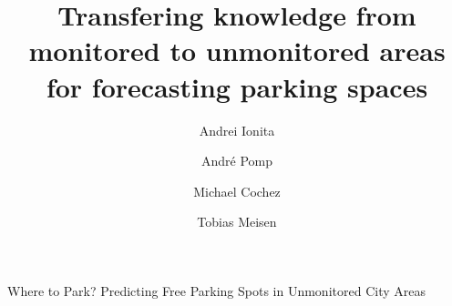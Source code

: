 \documentclass{ws-ijait}
\begin{document}
{Where to Park? Predicting Free Parking Spots in Unmonitored City Areas}

%
\catchline{}{}{}{}{}
%

\title{Transfering knowledge from monitored to unmonitored areas for forecasting parking spaces}


\author{Andrei Ionita}
\address{%
	Computer Science, RWTH Aachen University \\
	Aachen, Germany \\
	andrei.ionita@rwth-aachen.de
}


\author{André Pomp}
\address{%
	Institute of Information Management in Mechanical Engineering, RWTH Aachen University,\\
	Aachen Germany \\
	andre.pomp@ima.rwth-aachen.de
}


\author{Michael Cochez}
\address{
	Fraunhofer Institute for Applied Information Technology FIT, Aachen, Germany \\
	Computer Science 5, RWTH Aachen University, Germany \\
	Faculty of Information Technology, University of Jyväskylä, Finland \\
	michael.cochez@fit.fraunhofer.de
}

\author{Tobias Meisen}
\address{%
	Chair of Technologies and Management of Digital Transformation, University of Wuppertal, \\
	Wuppertal, Germany \\
	meisen@uni-wuppertal.de
}
\end{document}

